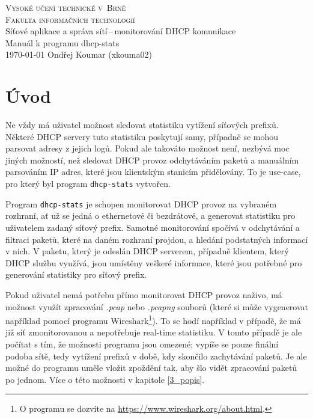 \documentclass[a4paper, 11pt, hidelinks]{article}
\begin{document}
\begin{titlepage}
    \begin{center}
        \Huge \textsc{Vysoké učení technické v~Brně} \\
        \huge \textsc{Fakulta informačních technologií} \\
        Síťové aplikace a správa sítí\,--\,monitorování DHCP komunikace\\
        \Huge  Manuál k programu dhcp-stats\\
        \Large \today{} \hfill Ondřej Koumar (xkouma02)
    \end{center}
\end{titlepage}

\tableofcontents

\newpage

\section*{Úvod}\label{0_uvod}
Ne vždy má uživatel možnost sledovat statistiku vytížení síťových prefixů.
Některé DHCP servery tuto statistiku poskytují samy, případně se mohou parsovat adresy z jejich logů.
Pokud ale takováto možnost není, nezbývá moc jiných možností, než sledovat DHCP provoz odchytáváním paketů a manuálním parsováním IP adres, které jsou klientským stanicím přidělovány.
To je use-case, pro který byl program \texttt{dhcp-stats} vytvořen.

Program \texttt{dhcp-stats} je schopen monitorovat DHCP provoz na vybraném rozhraní, ať už se jedná o ethernetové či bezdrátové, a generovat statistiku pro uživatelem zadaný síťový prefix.
Samotné monitorování spočívá v odchytávání a filtraci paketů, které na daném rozhraní projdou, a hledání podstatných informací v nich.
V paketu, který je odeslán DHCP serverem, případně klientem, který DHCP službu využívá, jsou umístěny veškeré informace, které jsou potřebné pro generování statistiky pro síťový prefix.

Pokud uživatel nemá potřebu přímo monitorovat DHCP provoz naživo, má možnost využít zpracování \emph{.pcap} nebo \emph{.pcapng} souborů (které si může vygenerovat například pomocí programu Wireshark\footnote{O programu se dozvíte na \href{https://www.wireshark.org/about.html}{https://www.wireshark.org/about.html}.}).
To se hodí například v případě, že má již síť zmonitorovanou a nepotřebuje real-time statistiku.
V tomto případě je ale počítat s tím, že možnosti programu jsou omezené; vypíše se pouze finální podoba sítě, tedy vytížení prefixů v době, kdy skončilo zachytávání paketů.
Je ale možné do programu uměle vložit zpoždění tak, aby šlo vidět zpracování paketů po jednom.
Více o této možnosti v kapitole \ref{3_popis}.
\end{document}
